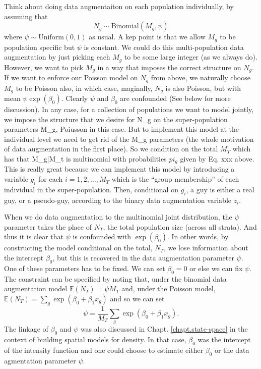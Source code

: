 Think about doing data augmentaiton on each
population individually, by assuming that 
\[
 N_{g} \sim \mbox{Binomial}(M_{g} , \psi)
\]
where $\psi \sim \mbox{Uniform}(0,1)$ as usual. 
A kep point is that  
we allow $M_{g}$ to be population specific but
$\psi$ is constant.
We could do this multi-population data augmentation by just picking each $M_{g}$ to
be some large integer (as we always do). However, we want to pick
$M_{g}$ in a way that imposes the correct structure on $N_{g}$. If
we want to enforce our Poisson model on $N_{g}$ from above, we
naturally choose
$M_{g}$ to be Poisson also, in which case, maginally, $N_{g}$ is also
Poisson, but with mean $\psi \exp(\beta_{0})$.  Clearly $\psi$ and $\beta_{0}$
are confounded (See below for more discussion).
In any case, for a collection of populations we want to model jointly,
we impose the structure that we desire for N_{g} on the
super-population parameters M_{g}, Poiusson in this case.
But to implement this model at the individual level we need to get rid
of the M_{g} parameters (the whole motivation of data augmentation in
the first place). So we condition on the total $M_{T}$ which has that
M_{g}|M_{t} is multinomial with probabilities $pi_{g}$ given by
Eq. xxx above.  This is really great because we can implement this
model by introducing a variable $g_{i}$ for each $i=1,2,\ldots, M_{T}$
which is the ``group membership'' of each individual in the
super-population.   Then, conditional on $g_{i}$, a guy is either a
real guy, or a pseudo-guy, according to the binary data augmentation
variable $z_{i}$.  







When we do data augmentation to the multinomial joint distribution,
the $\psi$ parameter takes the place of $N_{T}$, the total population
size (across all strata). And thus it is clear that $\psi$ is
confounded with $\exp(\beta_{0})$. In other words, by constructing the
model conditional on the total, $N_{T}$, we lose information about the
intercept $\beta_{0}$, but this is recovered in the data augmentation
parameter $\psi$.  One of these parameters has to be fixed. We can set
$\beta_0 = 0$ or else we can fix $\psi$.  The constraint can be
specified by noting that, under the binomial data augmentation model
$\mathbb{E}(N_{T}) = \psi M_{T}$ and, under the Poisson model,
$\mathbb{E}(N_{T}) = \sum_{g} \exp(\beta_{0} + \beta_{1} x_{g})$ and
so we can set
\[
 \psi = \frac{1}{M_{T}} \sum_{g} \exp(\beta_{0} + \beta_{1} x_{g}).
\]
The linkage of $\beta_{0}$ and $\psi$ was also discussed in
Chapt. \ref{chapt.state-space} in the context of building spatial
models for density. In that case, $\beta_0$ was the intercept of the
intensity function and one could choose to estimate either $\beta_0$
or the data agmentation parameter $\psi$.

